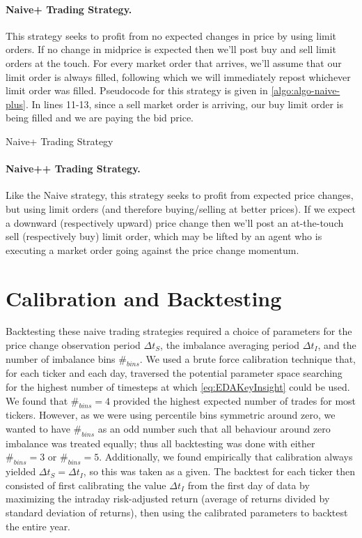 \paragraph{Naive+ Trading Strategy.} This strategy seeks to profit from no expected changes in price by using limit orders. If no change in midprice is expected then we'll post buy and sell limit orders at the touch. For every market order that arrives, we'll assume that our limit order is always filled, following which we will immediately repost whichever limit order was filled. Pseudocode for this strategy is given in \autoref{algo:algo-naive-plus}. In lines 11-13, since a sell market order is arriving, our buy limit order is being filled and we are paying the bid price. 
\begin{algorithm}[htb]
	\caption{Naive+ Trading Strategy}
	
	\label{algo:algo-naive-plus}
\end{algorithm}

\paragraph{Naive++ Trading Strategy.} Like the Naive strategy, this strategy seeks to profit from expected price changes, but using limit orders (and therefore buying/selling at better prices). If we expect a downward (respectively upward) price change then we'll post an at-the-touch sell (respectively buy) limit order, which may be lifted by an agent who is executing a market order going against the price change momentum. 

\section{Calibration and Backtesting}
Backtesting these naive trading strategies required a choice of parameters for the price change observation period $\Delta t_S$, the imbalance averaging period $\Delta t_I$, and the number of imbalance bins $\#_{bins}$. We used a brute force calibration technique that, for each ticker and each day, traversed the potential parameter space searching for the highest number of timesteps at which \eqref{eq:EDAKeyInsight} could be used. We found that $\#_{bins} = 4$ provided the highest expected number of trades for most tickers. However, as we were using percentile bins symmetric around zero, we wanted to have $\#_{bins}$ as an odd number such that all behaviour around zero imbalance was treated equally; thus all backtesting was done with either $\#_{bins} = 3$ or $\#_{bins} = 5$. Additionally, we found empirically that calibration always yielded $\Delta t_S = \Delta t_I$, so this was taken as a given. The backtest for each ticker then consisted of first calibrating the value $\Delta t_I$ from the first day of data by maximizing the intraday risk-adjusted return (average of returns divided by standard deviation of returns), then using the calibrated parameters to backtest the entire year.

